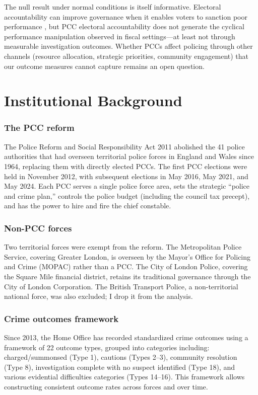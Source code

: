 \documentclass[12pt]{article}
\begin{document}
The null result under normal conditions is itself informative. Electoral accountability can improve governance when it enables voters to sanction poor performance \citep{ferraz2011electoral, besley2002political}, but PCC electoral accountability does not generate the cyclical performance manipulation observed in fiscal settings---at least not through measurable investigation outcomes. Whether PCCs affect policing through other channels (resource allocation, strategic priorities, community engagement) that our outcome measures cannot capture remains an open question.


\section{Institutional Background}

\subsubsection*{The PCC reform} The Police Reform and Social Responsibility Act 2011 abolished the 41 police authorities that had overseen territorial police forces in England and Wales since 1964, replacing them with directly elected PCCs. The first PCC elections were held in November 2012, with subsequent elections in May 2016, May 2021, and May 2024. Each PCC serves a single police force area, sets the strategic ``police and crime plan,'' controls the police budget (including the council tax precept), and has the power to hire and fire the chief constable.

\subsubsection*{Non-PCC forces} Two territorial forces were exempt from the reform. The Metropolitan Police Service, covering Greater London, is overseen by the Mayor's Office for Policing and Crime (MOPAC) rather than a PCC. The City of London Police, covering the Square Mile financial district, retains its traditional governance through the City of London Corporation. The British Transport Police, a non-territorial national force, was also excluded; I drop it from the analysis.

\subsubsection*{Crime outcomes framework} Since 2013, the Home Office has recorded standardized crime outcomes using a framework of 22 outcome types, grouped into categories including: charged/summonsed (Type 1), cautions (Types 2--3), community resolution (Type 8), investigation complete with no suspect identified (Type 18), and various evidential difficulties categories (Types 14--16). This framework allows constructing consistent outcome rates across forces and over time.
\end{document}
